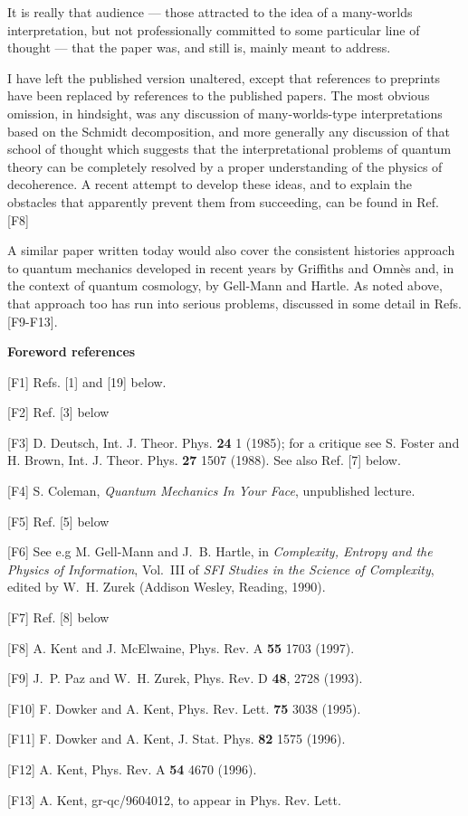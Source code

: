 \documentclass[aps,pra,12pt]{revtex4}
\begin{document}
It is really that audience --- those attracted to the idea of 
a many-worlds interpretation, but not professionally committed
to some particular line of thought --- that the paper was, and still
is, mainly meant to address.  

I have left the published version unaltered, except that  
references to preprints have been replaced by references
to the published papers.  The most obvious omission, in
hindsight, was any discussion of many-worlds-type interpretations 
based on the Schmidt decomposition, and more generally any 
discussion of that school of thought which suggests that 
the interpretational problems of quantum theory can be 
completely resolved by a proper understanding of the physics of 
decoherence.  A recent attempt to develop these ideas,
and to explain the obstacles that apparently prevent them
from succeeding, can be found in Ref. [F8]

A similar paper written today would also cover the 
consistent histories approach to quantum mechanics 
developed in recent years by Griffiths and Omn\`es and,
in the context of quantum cosmology, by Gell-Mann and Hartle.
As noted above, that approach too has run into serious problems, 
discussed in some detail in Refs. [F9-F13]. 

\vskip 10pt

\centerline{\bf Foreword references}

\vskip 10pt


\begin{description}
\item{[F1]} Refs. [1] and [19] below. 
\item{[F2]} Ref. [3] below 
\item{[F3]} D. Deutsch, Int. J. Theor. Phys. {\bf  24} 1 (1985); for a
critique see S. Foster and H. Brown, Int. J. Theor. Phys. {\bf 27}
1507 (1988).  See also Ref. [7] below. 
\item{[F4]} S. Coleman, {\it Quantum Mechanics In Your Face}, unpublished
lecture.
\item{[F5]} Ref. [5] below 
\item{[F6]} See e.g M. Gell-Mann and J.~B. Hartle,  in {\em Complexity, 
  Entropy and the Physics of   Information}, Vol.~III of {\em 
  SFI Studies in the Science of Complexity},   edited by 
  W.~H. Zurek (Addison Wesley, Reading, 1990).
\item{[F7]} Ref. [8] below
\item{[F8]} A. Kent and J. McElwaine, Phys. Rev. A {\bf 55} 1703 (1997). 
\item{[F9]} J.~P. Paz and W.~H. Zurek, Phys. Rev. D {\bf 48},  2728  (1993).
\item{[F10]} F. Dowker and A. Kent, Phys. Rev. Lett. {\bf 75} 3038 (1995). 
\item{[F11]} F. Dowker and A. Kent, J. Stat. Phys. {\bf 82} 1575 (1996).
\item{[F12]} A. Kent, Phys. Rev. A {\bf 54} 4670 (1996). 
\item{[F13]} A. Kent, gr-qc/9604012, to appear in Phys. Rev. Lett. 
\end{description}
\end{document}
